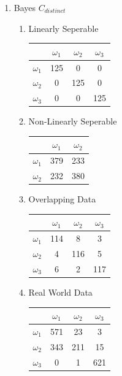 \documentclass[a4paper]{article}
\begin{document}
\begin{enumerate}
\item Bayes $C_{distinct}$

\begin{multicols}{2}
\begin{enumerate}
\item Linearly Seperable

\begin{tabular}{ l | c | c | c | }

& $\omega_1$ & $\omega_2$ & $\omega_3$ \\
\hline
  $\omega_1$ & 125 & 0 & 0 \\ 
\hline
  $\omega_2$ & 0 & 125 & 0 \\
\hline
  $\omega_3$ & 0 & 0 & 125 \\
\hline
\end{tabular}

\item Non-Linearly Seperable

\begin{tabular}{ l | c | c |}

& $\omega_1$ & $\omega_2$ \\
\hline
  $\omega_1$ & 379 & 233 \\ 
\hline
  $\omega_2$ & 232 & 380 \\
\hline
\end{tabular}
\newline

\item Overlapping Data

\begin{tabular}{ l | c | c | c | }

& $\omega_1$ & $\omega_2$ & $\omega_3$ \\
\hline
  $\omega_1$ & 114 & 8 & 3 \\ 
\hline
  $\omega_2$ & 4 & 116 & 5 \\
\hline
  $\omega_3$ & 6 & 2 & 117 \\
\hline
\end{tabular}

\item Real World Data

\begin{tabular}{ l | c | c | c | }
& $\omega_1$ & $\omega_2$ & $\omega_3$ \\
\hline
  $\omega_1$ & 571 & 23 & 3 \\ 
\hline
  $\omega_2$ & 343 & 211 & 15 \\
\hline
  $\omega_3$ & 0 & 1 & 621 \\
\hline
\end{tabular}
\end{enumerate}
\end{multicols}


\end{enumerate}
\end{document}
